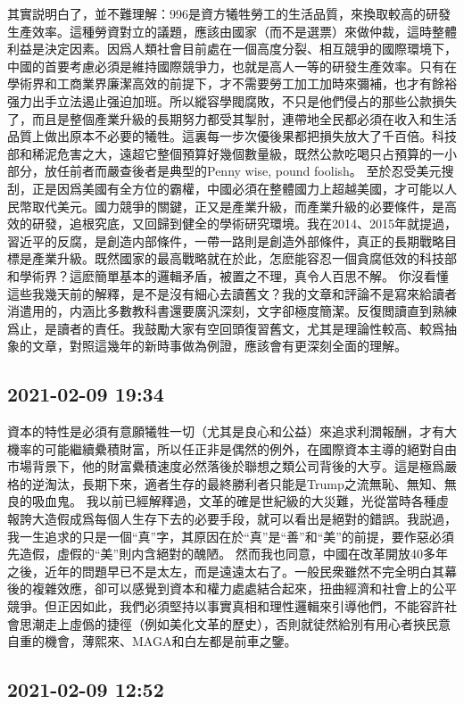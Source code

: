\documentclass[twocolumn]{ctexart}
\begin{document}
其實説明白了，並不難理解：996是資方犧牲勞工的生活品質，來換取較高的研發生產效率。這種勞資對立的議題，應該由國家（而不是選票）來做仲裁，這時整體利益是決定因素。因爲人類社會目前處在一個高度分裂、相互競爭的國際環境下，中國的首要考慮必須是維持國際競爭力，也就是高人一等的研發生產效率。只有在學術界和工商業界廉潔高效的前提下，才不需要勞工加工加時來彌補，也才有餘裕强力出手立法遏止强迫加班。所以縱容學閥腐敗，不只是他們侵占的那些公款損失了，而且是整個產業升級的長期努力都受其掣肘，連帶地全民都必須在收入和生活品質上做出原本不必要的犧牲。這裏每一步次優後果都把損失放大了千百倍。科技部和稀泥危害之大，遠超它整個預算好幾個數量級，既然公款吃喝只占預算的一小部分，放任前者而嚴查後者是典型的Penny wise, pound foolish。
至於忍受美元搜刮，正是因爲美國有全方位的霸權，中國必須在整體國力上超越美國，才可能以人民幣取代美元。國力競爭的關鍵，正又是產業升級，而產業升級的必要條件，是高效的研發，追根究底，又回歸到健全的學術研究環境。我在2014、2015年就提過，習近平的反腐，是創造内部條件，一帶一路則是創造外部條件，真正的長期戰略目標是產業升級。既然國家的最高戰略就在於此，怎麽能容忍一個貪腐低效的科技部和學術界？這麽簡單基本的邏輯矛盾，被置之不理，真令人百思不解。
你沒看懂這些我幾天前的解釋，是不是沒有細心去讀舊文？我的文章和評論不是寫來給讀者消遣用的，内涵比多數教科書還要廣汎深刻，文字卻極度簡潔。反復閲讀直到熟練爲止，是讀者的責任。我鼓勵大家有空回頭復習舊文，尤其是理論性較高、較爲抽象的文章，對照這幾年的新時事做為例證，應該會有更深刻全面的理解。
\subsection*{2021-02-09 19:34}

資本的特性是必須有意願犧牲一切（尤其是良心和公益）來追求利潤報酬，才有大機率的可能繼續纍積財富，所以任正非是偶然的例外，在國際資本主導的絕對自由市場背景下，他的財富纍積速度必然落後於聯想之類公司背後的大亨。這是極爲嚴格的逆淘汰，長期下來，適者生存的最終勝利者只能是Trump之流無恥、無知、無良的吸血鬼。
我以前已經解釋過，文革的確是世紀級的大災難，光從當時各種虛報誇大造假成爲每個人生存下去的必要手段，就可以看出是絕對的錯誤。我説過，我一生追求的只是一個“真”字，其原因在於“真”是“善”和“美”的前提，要作惡必須先造假，虛假的“美”則内含絕對的醜陋。
然而我也同意，中國在改革開放40多年之後，近年的問題早已不是太左，而是遠遠太右了。一般民衆雖然不完全明白其幕後的複雜效應，卻可以感覺到資本和權力處處結合起來，扭曲經濟和社會上的公平競爭。但正因如此，我們必須堅持以事實真相和理性邏輯來引導他們，不能容許社會思潮走上虛僞的捷徑（例如美化文革的歷史），否則就徒然給別有用心者挾民意自重的機會，薄熙來、MAGA和白左都是前車之鑒。
\subsection*{2021-02-09 12:52}
\end{document}
